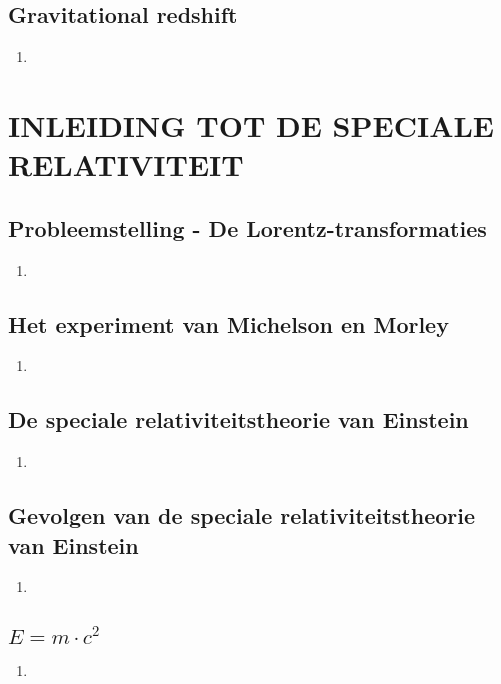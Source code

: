 \documentclass[12pt]{article}
\begin{document}
    \subsection{Gravitational redshift}
    \begin{enumerate}
        \item 
    \end{enumerate}



    \section{INLEIDING TOT DE SPECIALE RELATIVITEIT}
    \subsection{Probleemstelling - De Lorentz-transformaties}
    \begin{enumerate}
        \item 
    \end{enumerate}
    \subsection{Het experiment van Michelson en Morley}
    \begin{enumerate}
        \item 
    \end{enumerate}
    \subsection{De speciale relativiteitstheorie van Einstein}
    \begin{enumerate}
        \item 
    \end{enumerate}
    \subsection{Gevolgen van de speciale relativiteitstheorie van Einstein}
    \begin{enumerate}
        \item 
    \end{enumerate}
    \subsection{$E=m \cdot c^2$}
    \begin{enumerate}
        \item 
    \end{enumerate}
\end{document}
